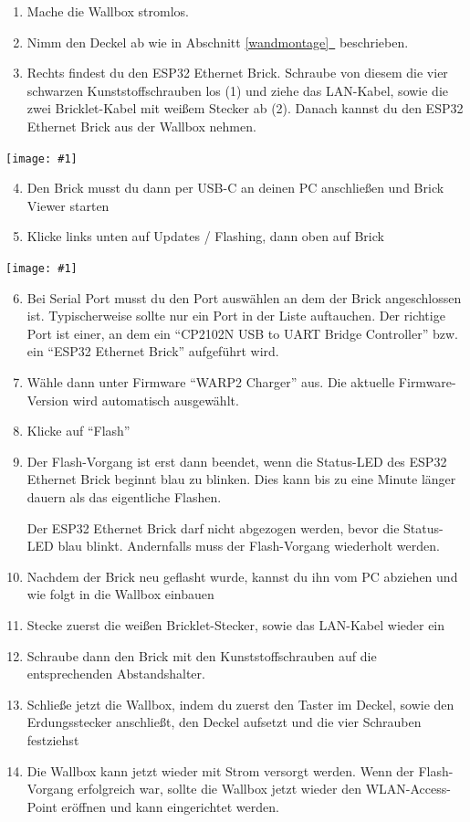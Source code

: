 \documentclass[a4paper,10pt]{article}
\newcommand{\hint}[1]{\begin{tcolorbox}[colback=boxgray,colframe=black,coltext=
white,title=Hinweis,left*=2mm,right*=2mm,boxsep=1mm,bottom=1mm,top=1mm]#1\end{tcolorbox}}
\newcommand{\gfx}[1]{\texttt{[image: \#1]}}
\newcommand*{\fullref}[1]{Abschnitt \hyperref[{#1}]{\ref*{#1}~\nameref*{#1}}}
\begin{document}
\begin{multicols*}{2}
    \begin{enumerate}
        \item Mache die Wallbox stromlos.
        \item Nimm den Deckel ab wie in \fullref{wandmontage} beschrieben.
        \item Rechts findest du den ESP32 Ethernet Brick. Schraube von diesem die vier schwarzen Kunststoffschrauben los (1) und ziehe das LAN-Kabel, sowie die zwei Bricklet-Kabel mit weißem Stecker
        ab (2). Danach kannst du den ESP32 Ethernet Brick aus der Wallbox nehmen.
    \end{enumerate}
    \gfx{./img_warp2/resized/warp_factory_reset_cropped}
    \begin{enumerate}
        \setcounter{enumi}{3}
        \item Den Brick musst du dann per USB-C an deinen PC anschließen und Brick Viewer starten
        \item Klicke links unten auf Updates / Flashing, dann oben auf Brick
    \end{enumerate}
    \gfx{./img_warp2/resized/warp_factory_flash}
    \begin{enumerate}
        \setcounter{enumi}{5}
        \item Bei Serial Port musst du den Port auswählen an dem der Brick angeschlossen ist.
              Typischerweise sollte nur ein Port in der Liste auftauchen.
              Der richtige Port ist einer, an dem ein \enquote{CP2102N USB to UART Bridge Controller} bzw. ein \enquote{ESP32 Ethernet Brick} aufgeführt wird.
        \item Wähle dann unter Firmware \enquote{WARP2 Charger} aus. Die aktuelle Firmware-Version wird automatisch ausgewählt.
        \item Klicke auf \enquote{Flash}
        \item Der Flash-Vorgang ist erst dann beendet, wenn die Status-LED des ESP32 Ethernet Brick beginnt blau zu blinken. Dies kann bis zu eine Minute länger dauern als das eigentliche Flashen.
        \hint{Der ESP32 Ethernet Brick darf nicht abgezogen werden, bevor die Status-LED blau blinkt. Andernfalls muss der Flash-Vorgang wiederholt werden.}
        \item Nachdem der Brick neu geflasht wurde, kannst du ihn vom PC abziehen und wie folgt in die Wallbox einbauen
        \item Stecke zuerst die weißen Bricklet-Stecker, sowie das LAN-Kabel wieder ein
        \item Schraube dann den Brick mit den Kunststoffschrauben auf die entsprechenden Abstandshalter.
        \item Schließe jetzt die Wallbox, indem du zuerst den Taster im Deckel, sowie den Erdungsstecker anschließt, den Deckel aufsetzt und die vier Schrauben festziehst
        \item Die Wallbox kann jetzt wieder mit Strom versorgt werden. Wenn der Flash-Vorgang erfolgreich war, sollte die Wallbox jetzt wieder den WLAN-Access-Point eröffnen und kann eingerichtet werden.
    \end{enumerate}


\end{multicols*}
\end{document}
